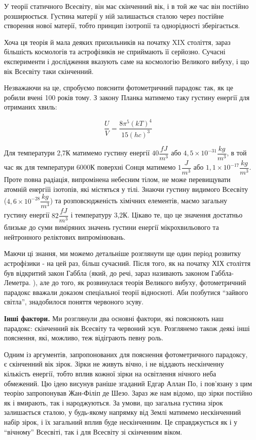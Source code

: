 \documentclass[a4paper]{article}
\begin{document}
У теорії статичного Всесвіту, він має скінченний вік, і в той же час він постійно розширюється. Густина матерії у ній залишається сталою через постійне створення нової матерії, тобто принцип ізотропії та однорідності зберігається.

Хоча ця теорія й мала деяких прихильників на початку XIX століття, зараз більшість космологів та астрофізиків не сприймають її серйозно. Сучасні експерименти і дослідження вказують саме на космологію Великого вибуху, і що вік Всесвіту таки скінченний. \cite{twoTheories}

Незважаючи на це, спробуємо пояснити фотометричний парадокс так, як це робили вчені 100 років тому. З закону Планка матимемо таку густину енергії для отриманих хвиль:

\begin{equation}
\label{steadyStateEnergy}
\dfrac{U}{V} = \dfrac{8\pi^5(kT)^4}{15(hc)^3}
\end{equation}

Для температури 2,7К матимемо густину енергії $40 \dfrac{fJ}{m^3}$ або $4,5 \times 10^{-31} \dfrac{kg}{m^3}$, в той час як для температури 6000К поверхні Сонця матимемо $1 \dfrac{J}{m^3}$ або $1,1 \times 10^{-17} \dfrac{kg}{m^3}$. Проте повна радіація, випромінена небесним тілом, не може перевищувати атомній енергіїі ізотопів, які містяться у тілі. Знаючи густину видимого Всесвіту ($4,6 \times 10^{-28} \dfrac{kg}{m^3}$) та розповсюдженість хімічних елементів, маємо загальну густину енергії $82 \dfrac{fJ}{m^3}$ і температуру 3,2К. Цікаво те, що це значення достатньо близьке до суми виміряних значень густини енергії мікрохвильового та нейтронного реліктових випромінювань. \cite{twoTheories}

Маючи ці знання, ми можемо детальніше розглянути ще один період розвитку астрофізики - на цей раз, більш сучасний. Після того, як на початку ХІХ століття був відкритий закон Габбла (який, до речі, зараз називають законом Габбла-Леметра. \cite{hubbleLemaitre}), але до того, як розвинулася теорія Великого вибуху, фотометричний парадокс вважали доказом спеціальної теорії відносноті. Аби позбутися ``зайвого світла'', знадобилося поняття червоного зсуву. \cite{relativityFAQ}

\textbf{Інші фактори.}
Ми розглянули два основні фактори, які пояснюють наш парадокс: скінченний вік Всесвіту та червоний зсув. Розглянемо також деякі інші пояснення, які, можливо, теж відіграють певну роль.

Одним із аргументів, запропонованих для пояснення фотометричного парадоксу, є скінченний вік зірок. Зірки не живуть вічно, і не віддають нескінченну кількість енергії, тобто вплив кожної зірки на освітлення нічного неба обмежений. Цю ідею висунув раніше згаданий Едгар Аллан По, і пов'язану з цим теорію запропонував Жан-Філіп де Шезо. Зараз же нам відомо, що зірки постійно як і вмирають, так і народжуються. За умови, що загальна густина зірок залишається сталою, у будь-якому напрямку від Землі матимемо нескінченний набір зірок, і їх загальний вплив буде нескінченним. Це справджується як і у ``вічному'' Всесвіті, так і для Всесвіту зі скінченним віком.
\end{document}
